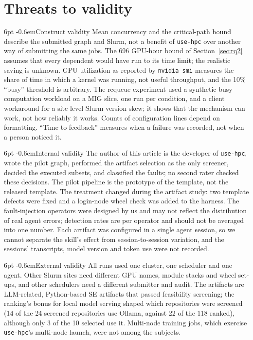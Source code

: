 \documentclass[pdflatex,sn-mathphys-num]{sn-jnl}
\makeatletter
\theoremstyle{thmstyletwo}%
\theoremstyle{thmstylethree}%
\newcommand{\tool}{\texttt{use-hpc}}
\newcommand{\code}[1]{\texttt{#1}}
\renewcommand\paragraph{\@startsection{paragraph}{4}{\z@}%
  {6pt \@plus 2pt \@minus 1pt}{-0.6em}{\normalfont\normalsize\bfseries}}
\makeatother
\begin{document}
\section{Threats to validity}\label{sec:threats}

\paragraph{Construct validity} Mean concurrency and the critical-path bound describe the submitted graph and Slurm, not a benefit of \tool{} over another way of submitting the same jobs. The 696 GPU-hour bound of Section~\ref{sec:rq2} assumes that every dependent would have run to its time limit; the realistic saving is unknown. GPU utilization as reported by \code{nvidia-smi} measures the share of time in which a kernel was running, not useful throughput, and the 10\% ``busy'' threshold is arbitrary. The requeue experiment used a synthetic busy-computation workload on a MIG slice, one run per condition, and a client workaround for a site-level Slurm version skew; it shows that the mechanism can work, not how reliably it works. Counts of configuration lines depend on formatting. ``Time to feedback'' measures when a failure was recorded, not when a person noticed it.

\paragraph{Internal validity} The author of this article is the developer of \tool{}, wrote the pilot graph, performed the artifact selection as the only screener, decided the executed subsets, and classified the faults; no second rater checked these decisions. The pilot pipeline is the prototype of the template, not the released template. The treatment changed during the artifact study: two template defects were fixed and a login-node wheel check was added to the harness. The fault-injection operators were designed by us and may not reflect the distribution of real agent errors; detection rates are per operator and should not be averaged into one number. Each artifact was configured in a single agent session, so we cannot separate the skill's effect from session-to-session variation, and the sessions' transcripts, model version and token use were not recorded.

\paragraph{External validity} All runs used one cluster, one scheduler and one agent. Other Slurm sites need different GPU names, module stacks and wheel set-ups, and other schedulers need a different submitter and audit. The artifacts are LLM-related, Python-based SE artifacts that passed feasibility screening; the ranking's bonus for local model serving shaped which repositories were screened (14 of the 24 screened repositories use Ollama, against 22 of the 118 ranked), although only 3 of the 10 selected use it. Multi-node training jobs, which exercise \tool{}'s multi-node launch, were not among the subjects.
\end{document}
